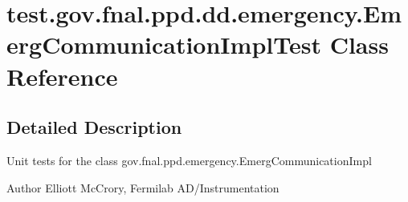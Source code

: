 \hypertarget{classtest_1_1gov_1_1fnal_1_1ppd_1_1dd_1_1emergency_1_1EmergCommunicationImplTest}{\section{test.\-gov.\-fnal.\-ppd.\-dd.\-emergency.\-Emerg\-Communication\-Impl\-Test Class Reference}
\label{classtest_1_1gov_1_1fnal_1_1ppd_1_1dd_1_1emergency_1_1EmergCommunicationImplTest}
}


\subsection{Detailed Description}
Unit tests for the class gov.\-fnal.\-ppd.\-emergency.\-Emerg\-Communication\-Impl

\begin{DoxyAuthor}{Author}
Elliott Mc\-Crory, Fermilab A\-D/\-Instrumentation 
\end{DoxyAuthor}

